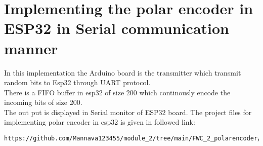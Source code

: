 \documentclass[journal,5pt,twocolumn]{IEEEtran}
\begin{document}
\section{\textbf{Implementing the polar encoder in ESP32 in Serial communication manner}}
In this implementation the Arduino board is the transmitter which transmit random bits to Esp32 through UART protocol. \\
There is a FIFO buffer in esp32 of size 200 which continously encode the incoming bits of size 200.\\
The out put is displayed in Serial monitor of ESP32 board.
The project files for implementing polar encoder in esp32 is given in followed link:
\begin{lstlisting}
https://github.com/Mannava123455/module_2/tree/main/FWC_2_polarencoder/codes/polar_encoder_esp32
 \end{lstlisting}



 
 
\end{document}
